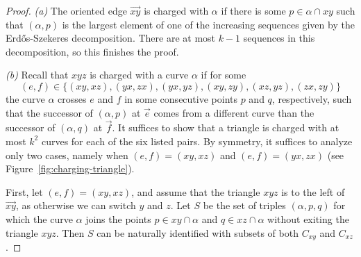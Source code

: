 \documentclass[11pt]{amsart}
\theoremstyle{definition}
\begin{document}
\begin{proof}
\textit{(a)} The oriented edge $\vec{xy}$ is charged with $\alpha$ if there is some $p\in \alpha\cap xy$ such that $(\alpha, p)$ is the largest element of one of the increasing sequences given by the Erd\H{o}s-Szekeres decomposition. There are at most $k-1$ sequences in this decomposition, so this finishes the proof.

\medskip
\textit{(b)} Recall that $xyz$ is charged with a curve $\alpha$ if for some $$(e,f)\in \{(xy,xz),(yx,zx),(yx,yz),(xy,zy),(xz,yz),(zx,zy)\}$$
the curve $\alpha$ crosses $e$ and $f$ in some consecutive points $p$ and $q$, respectively, such that the successor of $(\alpha,p)$ at $\vec{e}$ comes from a different curve than the successor of $(\alpha,q)$ at $\vec{f}$. It suffices to show that a triangle is charged with at most $k^2$ curves for each of the six listed pairs. By symmetry, it suffices to analyze only two cases, namely when $(e,f)=(xy,xz)$ and $(e, f)=(yx, zx)$ (see Figure~\ref{fig:charging-triangle}).

First, let $(e, f)=(xy, xz)$, and assume that the triangle $xyz$ is to the left of $\vec{xy}$, as otherwise we can switch $y$ and $z$. Let $S$ be the set of triples $(\alpha, p, q)$ for which the curve $\alpha$ joins the points $p\in xy\cap \alpha$ and $q\in xz\cap \alpha$ without exiting the triangle $xyz$. Then $S$ can be naturally identified with subsets of both $C_{xy}$ and $C_{xz}$.


\end{proof}
\end{document}
